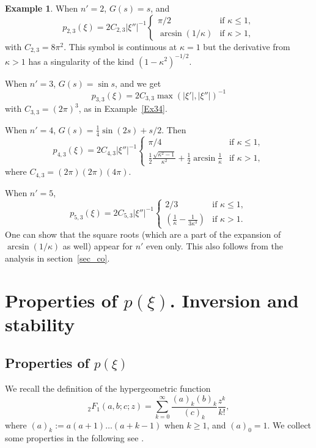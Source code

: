 \documentclass[11pt]{amsart}
\theoremstyle{definition}
\newtheorem{example}[theorem]{Example}
\theoremstyle{remark}
\numberwithin{equation}{section}
\begin{document}
\begin{example}
When $n'=2$, $G(s)=s$, and 
\[
p_{2,3}(\xi) =   2 C_{2,3} |\xi''|^{-1} 
\begin{cases}
 \pi/2 & \text{if $\kappa\le 1$},\\
\arcsin(1/\kappa)& \text{if $\kappa>1$},
\end{cases}
\]
with $C_{2,3}=8\pi^2$.  
This symbol is continuous at $\kappa=1$ but the derivative from $\kappa>1$ has a singularity of the kind $(1-\kappa^2)^{-1/2}$.

When $n'=3$, $G(s)=\sin s$, and we get
\[
p_{3,3}(\xi) = 2 C_{3,3} \max(|\xi'|, |\xi''|)^{-1} 
\]
with $C_{3,3}=(2\pi)^3$, as in Example~\ref{Ex34}.  

When $n'=4$, $G(s)=\frac14 \sin(2s)+s/2$. Then  
\[
p_{4,3}(\xi) = 2 C_{4,3} |\xi''|^{-1} 
\begin{cases}
 \pi/4 & \text{if $\kappa\le 1$},\\
\frac{1}{2} \frac{\sqrt{\kappa^2 -1}}{\kappa^2} + \frac{1}{2} \arcsin{\frac{1}{\kappa}}& \text{if $\kappa>1$},
\end{cases} 
\]
where $C_{4,3}=(2\pi) (2\pi)(4\pi)$.


When $n'=5$, 
\[
p_{5,3}(\xi) = 2 C_{5,3} |\xi''|^{-1} 
\begin{cases}
 2/3 & \text{if $\kappa\le 1$},\\
\left( \frac{1}{\kappa} - \frac{1}{3\kappa^3} \right)& \text{if $\kappa>1$}.
\end{cases}
\]
One can show that the square roots (which are a part of the expansion of $\arcsin(1/\kappa)$ as well) appear for $n'$ even only. This also follows from the analysis in section~\ref{sec_co}. 
\end{example}

\section{Properties of $p(\xi)$. Inversion and stability} \label{sec_4}
\subsection{Properties of $p(\xi)$} 

We recall the definition of the hypergeometric function 
\begin{equation}   \label{hyper}
{}_2F_1(a,b;c;z) = \sum_{k=0}^\infty \frac{(a)_k(b)_k}{(c)_k} \frac{z^k}{k!},
\end{equation}
where $(a)_k:= a(a+1)\dots (a+k-1)$ when $k\ge1$, and $(a)_0=1$. We collect some properties in the following  {see \cite[Theorems~2.1.3,~2.2.2]{Andrews-SF}}. 
\end{document}
